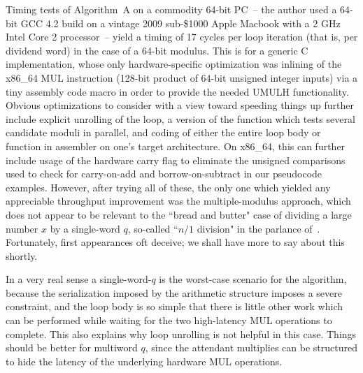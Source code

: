 \documentclass{article}
\begin{document}
Timing tests of Algorithm~A on a commodity 64-bit PC~-- the author used a 64-bit GCC 4.2 build on a vintage 2009 sub-\$1000 Apple Macbook with a 2 GHz Intel Core 2 processor~-- yield a timing of 17 cycles per loop iteration (that is, per dividend word) in the case of a 64-bit modulus. This is for a generic C implementation, whose only hardware-specific optimization was inlining of the x86\_64 MUL instruction (128-bit product of 64-bit unsigned integer inputs) via a tiny assembly code macro in order to provide the needed UMULH functionality. Obvious optimizations to consider with a view toward speeding things up further include explicit unrolling of the loop, a version of the function which tests several candidate moduli in parallel, and coding of either the entire loop body or function in assembler on one's target architecture. On x86\_64, this can further include usage of the hardware carry flag to eliminate the unsigned comparisons used to check for carry-on-add and borrow-on-subtract in our pseudocode examples. However, after trying all of these, the only one which yielded any appreciable throughput improvement was the multiple-modulus approach, which does not appear to be relevant to the ``bread and butter" case of dividing a large number $x$ by a single-word $q$, so-called ``$n/1$ division" in the parlance of~\cite{GMP_div}. Fortunately, first appearances oft deceive; we shall have more to say about this shortly.

In a very real sense a single-word-$q$ is the worst-case scenario for the algorithm, because the serialization imposed by the arithmetic structure imposes a severe constraint, and the loop body is so simple that there is little other work which can be performed while waiting for the two high-latency MUL operations to complete. This also explains why loop unrolling is not helpful in this case. Things should be better for multiword $q$, since the attendant multiplies can be structured to hide the latency of the underlying hardware MUL operations.
\end{document}
